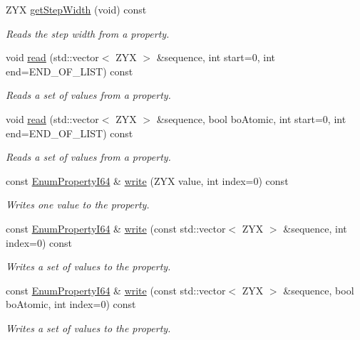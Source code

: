 \begin{DoxyCompactItemize}
Z\+Y\+X \hyperlink{classmv_i_m_p_a_c_t_1_1acquire_1_1_enum_property_i64_a09202e4e8c1a3b4a947fead01511f462}{get\+Step\+Width} (void) const 
\begin{DoxyCompactList}\small\item\em Reads the step width from a property. \end{DoxyCompactList}\item 
void \hyperlink{classmv_i_m_p_a_c_t_1_1acquire_1_1_enum_property_i64_a83cdb350455988ee7ccb318048950e0f}{read} (std\+::vector$<$ Z\+Y\+X $>$ \&sequence, int start=0, int end=E\+N\+D\+\_\+\+O\+F\+\_\+\+L\+I\+S\+T) const 
\begin{DoxyCompactList}\small\item\em Reads a set of values from a property. \end{DoxyCompactList}\item 
void \hyperlink{classmv_i_m_p_a_c_t_1_1acquire_1_1_enum_property_i64_acc49fca65cb6d66680fa75441be081fe}{read} (std\+::vector$<$ Z\+Y\+X $>$ \&sequence, bool bo\+Atomic, int start=0, int end=E\+N\+D\+\_\+\+O\+F\+\_\+\+L\+I\+S\+T) const 
\begin{DoxyCompactList}\small\item\em Reads a set of values from a property. \end{DoxyCompactList}\item 
const \hyperlink{classmv_i_m_p_a_c_t_1_1acquire_1_1_enum_property_i64}{Enum\+Property\+I64} \& \hyperlink{classmv_i_m_p_a_c_t_1_1acquire_1_1_enum_property_i64_af07a08bb44499e26f0886a4aca9c5e13}{write} (Z\+Y\+X value, int index=0) const 
\begin{DoxyCompactList}\small\item\em Writes one value to the property. \end{DoxyCompactList}\item 
const \hyperlink{classmv_i_m_p_a_c_t_1_1acquire_1_1_enum_property_i64}{Enum\+Property\+I64} \& \hyperlink{classmv_i_m_p_a_c_t_1_1acquire_1_1_enum_property_i64_adc25b55a352e5510499d7dc08cf058f3}{write} (const std\+::vector$<$ Z\+Y\+X $>$ \&sequence, int index=0) const 
\begin{DoxyCompactList}\small\item\em Writes a set of values to the property. \end{DoxyCompactList}\item 
const \hyperlink{classmv_i_m_p_a_c_t_1_1acquire_1_1_enum_property_i64}{Enum\+Property\+I64} \& \hyperlink{classmv_i_m_p_a_c_t_1_1acquire_1_1_enum_property_i64_a1578d7cdf22efdb368d6a899a44d2f69}{write} (const std\+::vector$<$ Z\+Y\+X $>$ \&sequence, bool bo\+Atomic, int index=0) const 
\begin{DoxyCompactList}\small\item\em Writes a set of values to the property. \end{DoxyCompactList}\end{DoxyCompactItemize}

